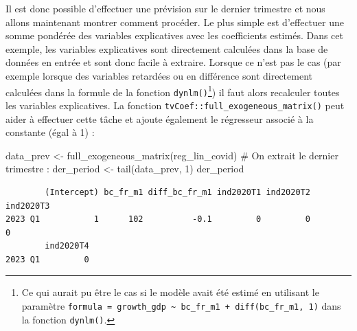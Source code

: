 \documentclass[
  a4paper,
  DIV=11,
  numbers=noendperiod,
  french]{scrartcl}
\newenvironment{Shaded}{\begin{snugshade}}{\end{snugshade}}
\newcommand{\CommentTok}[1]{\textcolor[rgb]{0.37,0.37,0.37}{#1}}
\newcommand{\DecValTok}[1]{\textcolor[rgb]{0.68,0.00,0.00}{#1}}
\newcommand{\FunctionTok}[1]{\textcolor[rgb]{0.28,0.35,0.67}{#1}}
\newcommand{\NormalTok}[1]{\textcolor[rgb]{0.00,0.23,0.31}{#1}}
\newcommand{\OtherTok}[1]{\textcolor[rgb]{0.00,0.23,0.31}{#1}}
\newcommand\1{{\mathds 1}}
\theoremstyle{remark}
\begin{document}
Il est donc possible d'effectuer une prévision sur le dernier trimestre
et nous allons maintenant montrer comment procéder. Le plus simple est
d'effectuer une somme pondérée des variables explicatives avec les
coefficients estimés. Dans cet exemple, les variables explicatives sont
directement calculées dans la base de données en entrée et sont donc
facile à extraire. Lorsque ce n'est pas le cas (par exemple lorsque des
variables retardées ou en différence sont directement calculées dans la
formule de la fonction \texttt{dynlm()}\footnote{ Ce qui aurait pu être
  le cas si le modèle avait été estimé en utilisant le paramètre
  \texttt{formula\ =\ growth\_gdp\ \textasciitilde{}\ bc\_fr\_m1\ +\ diff(bc\_fr\_m1,\ 1)}
  dans la fonction \texttt{dynlm()}.}) il faut alors recalculer toutes
les variables explicatives. La fonction
\texttt{tvCoef::full\_exogeneous\_matrix()} peut aider à effectuer cette
tâche et ajoute également le régresseur associé à la constante (égal à
1) :

\begin{Shaded}
\begin{Highlighting}[]
\NormalTok{data\_prev }\OtherTok{\textless{}{-}} \FunctionTok{full\_exogeneous\_matrix}\NormalTok{(reg\_lin\_covid)}
\CommentTok{\# On extrait le dernier trimestre :}
\NormalTok{der\_period }\OtherTok{\textless{}{-}} \FunctionTok{tail}\NormalTok{(data\_prev, }\DecValTok{1}\NormalTok{)}
\NormalTok{der\_period}
\end{Highlighting}
\end{Shaded}

\begin{verbatim}
        (Intercept) bc_fr_m1 diff_bc_fr_m1 ind2020T1 ind2020T2 ind2020T3
2023 Q1           1      102          -0.1         0         0         0
        ind2020T4
2023 Q1         0
\end{verbatim}
\end{document}
